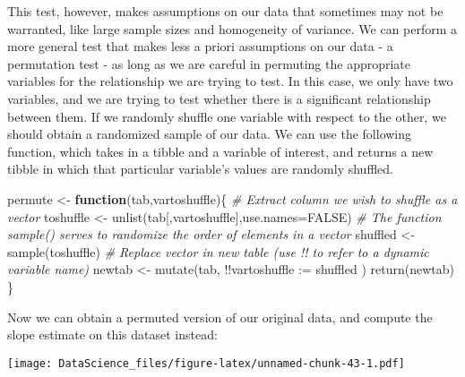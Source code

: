 \documentclass[
]{book}
\newenvironment{Shaded}{\begin{snugshade}}{\end{snugshade}}
\newcommand{\AttributeTok}[1]{\textcolor[rgb]{0.77,0.63,0.00}{#1}}
\newcommand{\CommentTok}[1]{\textcolor[rgb]{0.56,0.35,0.01}{\textit{#1}}}
\newcommand{\ConstantTok}[1]{\textcolor[rgb]{0.00,0.00,0.00}{#1}}
\newcommand{\ControlFlowTok}[1]{\textcolor[rgb]{0.13,0.29,0.53}{\textbf{#1}}}
\newcommand{\FunctionTok}[1]{\textcolor[rgb]{0.00,0.00,0.00}{#1}}
\newcommand{\NormalTok}[1]{#1}
\newcommand{\OtherTok}[1]{\textcolor[rgb]{0.56,0.35,0.01}{#1}}
\newcommand{\SpecialCharTok}[1]{\textcolor[rgb]{0.00,0.00,0.00}{#1}}
\newcommand{\StringTok}[1]{\textcolor[rgb]{0.31,0.60,0.02}{#1}}
\begin{document}
This test, however, makes assumptions on our data that sometimes may not be warranted, like large sample sizes and homogeneity of variance. We can perform a more general test that makes less a priori assumptions on our data - a permutation test - as long as we are careful in permuting the appropriate variables for the relationship we are trying to test. In this case, we only have two variables, and we are trying to test whether there is a significant relationship between them. If we randomly shuffle one variable with respect to the other, we should obtain a randomized sample of our data. We can use the following function, which takes in a tibble and a variable of interest, and returns a new tibble in which that particular variable's values are randomly shuffled.

\begin{Shaded}
\begin{Highlighting}[]
\NormalTok{permute }\OtherTok{\textless{}{-}} \ControlFlowTok{function}\NormalTok{(tab,vartoshuffle)\{}
  \CommentTok{\# Extract column we wish to shuffle as a vector}
\NormalTok{  toshuffle }\OtherTok{\textless{}{-}} \FunctionTok{unlist}\NormalTok{(tab[,vartoshuffle],}\AttributeTok{use.names=}\ConstantTok{FALSE}\NormalTok{)}
  \CommentTok{\# The function sample() serves to randomize the order of elements in a vector}
\NormalTok{  shuffled }\OtherTok{\textless{}{-}} \FunctionTok{sample}\NormalTok{(toshuffle)}
  \CommentTok{\# Replace vector in new table (use !! to refer to a dynamic variable name)}
\NormalTok{  newtab }\OtherTok{\textless{}{-}} \FunctionTok{mutate}\NormalTok{(tab, }\SpecialCharTok{!!}\AttributeTok{vartoshuffle :=}\NormalTok{ shuffled )}
  \FunctionTok{return}\NormalTok{(newtab)}
\NormalTok{\}}
\end{Highlighting}
\end{Shaded}

Now we can obtain a permuted version of our original data, and compute the slope estimate on this dataset instead:

\begin{Shaded}
\end{Shaded}

\texttt{[image: DataScience\_files/figure-latex/unnamed-chunk-43-1.pdf]}
\end{document}
